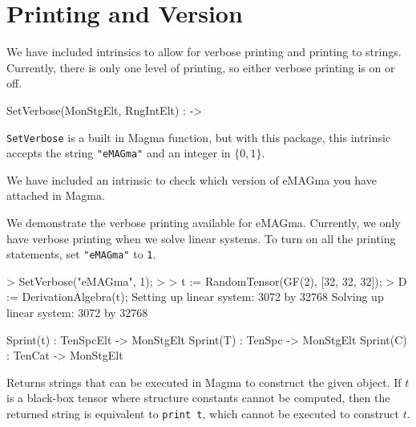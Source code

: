 \documentclass{documentation}
\begin{document}
\section{Printing and Version}

We have included intrinsics to allow for verbose printing and printing to strings. 
Currently, there is only one level of printing, so either verbose printing is on or off. 

\begin{intrinsics}
SetVerbose(MonStgElt, RngIntElt) : -> 
\end{intrinsics}

{\tt SetVerbose} is a built in Magma function, but with this package, this intrinsic accepts the string {\tt "eMAGma"} and an integer in $\{0,1\}$. 

We have included an intrinsic to check which version of eMAGma you have attached in Magma.

\begin{example}[VerbosePrinting]
We demonstrate the verbose printing available for eMAGma. 
Currently, we only have verbose printing when we solve linear systems. 
To turn on all the printing statements, set {\tt "eMAGma"} to {\tt 1}. 

\begin{code}
> SetVerbose("eMAGma", 1);
> 
> t := RandomTensor(GF(2), [32, 32, 32]);
> D := DerivationAlgebra(t);
Setting up linear system: 3072 by 32768
Solving up linear system: 3072 by 32768
\end{code}
\end{example}

\begin{intrinsics}
Sprint(t) : TenSpcElt -> MonStgElt
Sprint(T) : TenSpc -> MonStgElt
Sprint(C) : TenCat -> MonStgElt
\end{intrinsics}

Returns strings that can be executed in Magma to construct the given object. 
If $t$ is a black-box tensor where structure constants cannot be computed, then the returned string is equivalent to \texttt{print t}, which cannot be executed to construct $t$. 
\end{document}
